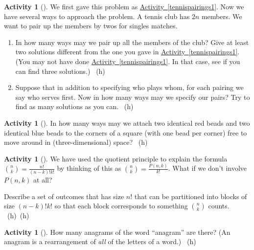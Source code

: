 \documentclass[10pt,]{book}
\theoremstyle{plain}
\theoremstyle{definition}
\theoremstyle{definition}
\theoremstyle{definition}
\newtheorem{activity}[project]{Activity}
\numberwithin{equation}{chapter}
\begin{document}
\begin{activity}[]\label{tennispairings2}
\hypertarget{p-770}{}%
We first gave this problem as \hyperref[tennispairings1]{Activity~\ref{tennispairings1}}. Now we have several ways to approach the problem. A tennis club has \(2n\) members. We want to pair up the members by twos for singles matches.%
\begin{enumerate}[font=\bfseries,label=(\alph*),ref=\alph*]
\item\label{task-145} \hypertarget{p-771}{}%
In how many ways may we pair up all the members of the club? Give at least two solutions different from the one you gave in   \hyperref[tennispairings1]{Activity~\ref{tennispairings1}}. (You may not have done \hyperref[tennispairings1]{Activity~\ref{tennispairings1}}. In that case, see if you can find three solutions.)%
~{\tiny (h)}\item\label{task-146} \hypertarget{p-775}{}%
Suppose that in addition to specifying who plays whom, for each pairing we say who serves first.  Now in how many ways may we specify our pairs? Try to find as many solutions as you can.%
~{\tiny (h)}\end{enumerate}
\end{activity}
\begin{activity}[]\label{twocolorsofbeads}
\hypertarget{p-779}{}%
In how many ways may we attach two identical red beads and two identical blue beads to the corners of a square (with one bead per corner) free to move around in (three-dimensional) space?%
~{\tiny (h)}\end{activity}
\begin{activity}[]\label{activity-107}
\hypertarget{p-782}{}%
We have used the quotient principle to explain the formula \(\binom{n}{k} = \frac{n!}{(n-k)!k!}\) by thinking of this as \(\binom{n}{k} = \frac{P(n,k)}{k!}\).  What if we don't involve \(P(n,k)\) at all?%
\par
\hypertarget{p-783}{}%
Describe a set of outcomes that has size \(n!\) that can be partitioned into blocks of size \((n-k)!k!\) so that each block corresponds to something \(\binom{n}{k}\) counts.%
~{\tiny (h)}~{\tiny (h)}\end{activity}
\begin{activity}[]\label{activity-108}
\hypertarget{p-786}{}%
How many anagrams of the word ``anagram'' are there? (An anagram is a rearrangement of \emph{all} of the letters of a word.)%
~{\tiny (h)}\end{activity}
\typeout{************************************************}
\typeout{************************************************}
\end{document}
